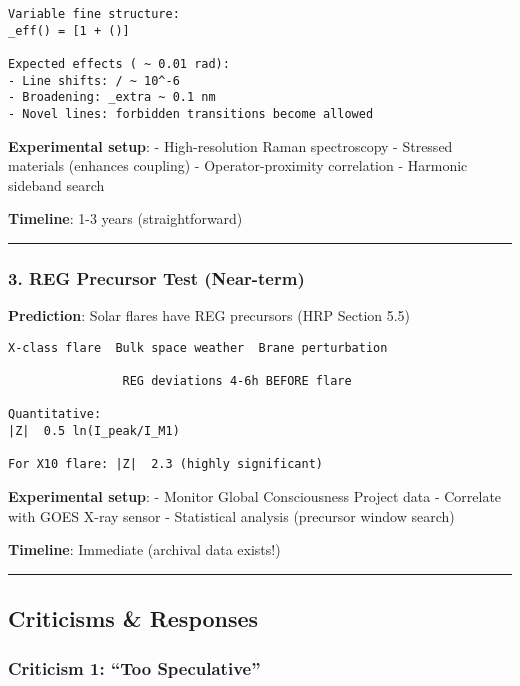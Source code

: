\begin{verbatim}
Variable fine structure:
_eff() = [1 + ()]

Expected effects ( ~ 0.01 rad):
- Line shifts: / ~ 10^-6
- Broadening: _extra ~ 0.1 nm
- Novel lines: forbidden transitions become allowed
\end{verbatim}

\textbf{Experimental setup}: - High-resolution Raman spectroscopy -
Stressed materials (enhances coupling) - Operator-proximity correlation
- Harmonic sideband search

\textbf{Timeline}: 1-3 years (straightforward)

\begin{center}\rule{0.5\linewidth}{0.5pt}\end{center}

\subsubsection{3. REG Precursor Test
(Near-term)}\label{reg-precursor-test-near-term}

\textbf{Prediction}: Solar flares have REG precursors (HRP Section 5.5)

\begin{verbatim}
X-class flare  Bulk space weather  Brane perturbation
                      
                REG deviations 4-6h BEFORE flare

Quantitative:
|Z|  0.5 ln(I_peak/I_M1)

For X10 flare: |Z|  2.3 (highly significant)
\end{verbatim}

\textbf{Experimental setup}: - Monitor Global Consciousness Project data
- Correlate with GOES X-ray sensor - Statistical analysis (precursor
window search)

\textbf{Timeline}: Immediate (archival data exists!)

\begin{center}\rule{0.5\linewidth}{0.5pt}\end{center}

\subsection{Criticisms \& Responses}\label{criticisms-responses}

\subsubsection{Criticism 1: ``Too
Speculative''}\label{criticism-1-too-speculative}

